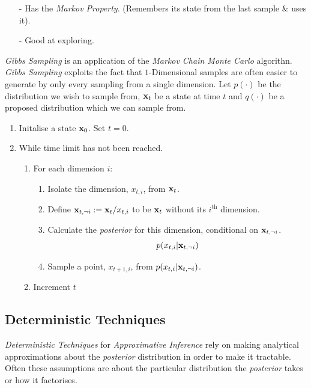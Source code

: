 \documentclass[11pt,a4paper]{article}
\begin{document}
\begin{itemize}
	\item[-] Has the \textit{Markov Property}. (\ie Remembers its state from the last sample \& uses it).
	\item[-] Good at exploring.
\end{itemize}

\textit{Gibbs Sampling} is an application of the \textit{Markov Chain Monte Carlo} algorithn. \textit{Gibbs Sampling} exploits the fact that $1$-Dimensional samples are often easier to generate by only every sampling from a single dimension.
Let $p(\cdot)$ be the distribution we wish to sample from, $\textbf{x}_t$ be a state at time $t$ and $q(\cdot)$ be a proposed distribution which we can sample from.
\begin{enumerate}
	\item Initalise a state $\textbf{x}_0$. Set $t=0$.
	\item While time limit has not been reached.
	\begin{enumerate}
		\item For each dimension $i$:
		\begin{enumerate}[label=\arabic*)]
			\item Isolate the dimension, $x_{t,i}$, from $\textbf{x}_t$.
			\item Define $\textbf{x}_{t,\neg i}:=\textbf{x}_t/x_{t,i}$ to be $\textbf{x}_t$ without its $i^\text{th}$ dimension.
			\item Calculate the \textit{posterior} for this dimension, conditional on $\textbf{x}_{t,\neg i}$.
			$$p(x_{t,i}|\textbf{x}_{t,\neg i})$$
			\item Sample a point, $x_{t+1,i}$, from $p(x_{t,i}|\textbf{x}_{t,\neg i})$.	
		\end{enumerate}
		\item Increment $t$
	\end{enumerate}
\end{enumerate}

\subsection{Deterministic Techniques}

\textit{Deterministic Techniques} for \textit{Approximative Inference} rely on making analytical approximations about the \textit{posterior} distribution in order to make it tractable.\\
Often these assumptions are about the particular distribution the \textit{posterior} takes or how it factorises.\\
\end{document}
